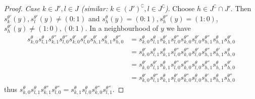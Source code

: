 \documentclass[ALCO,ThmDefs,Unicode,epreuves]{cedram}
\begin{document}
\begin{proof}
\emph{Case $k\in J',l\in J$ (similar: $k\in(J')^\complement, l\in J^\complement$)}.
Choose $h\in J^\complement\cap J'$.
Then $s^{\theta'}_k(y),s^{\theta'}_l(y)\neq (0:1)$ and
$s^\theta_h(y)=(0:1),s^{\theta''}_h(y)=(1:0)$, 
$s^{\theta'}_h(y)\neq (1:0),(0:1)$.
In a neighbourhood of $y$ we have
\[
\begin{aligned}
s^\theta_{k,0}s^\theta_{l,1}s^{\theta''}_{k,1}s^{\theta''}_{l,0}
s^{\theta'}_{k,0}s^{\theta'}_{l,0}
s^{\theta'}_{h,1}s^\theta_{h,1}s^{\theta''}_{h,0}
&=s^\theta_{k,0}s^\theta_{l,1}s^{\theta'}_{k,1}s^{\theta''}_{l,0}
s^{\theta''}_{k,0}s^{\theta'}_{l,0}
s^{\theta''}_{h,1}s^\theta_{h,1}s^{\theta'}_{h,0}\\
&=s^{\theta'}_{k,0}s^\theta_{l,1}s^\theta_{k,1}s^{\theta''}_{l,0}
s^{\theta''}_{k,0}s^{\theta'}_{l,0}
s^{\theta''}_{h,1}s^{\theta'}_{h,1}s^\theta_{h,0}\\
&=s^{\theta'}_{k,0}s^{\theta'}_{l,1}s^\theta_{k,1}s^{\theta''}_{l,0}
s^{\theta''}_{k,0}s^\theta_{l,0}
s^{\theta''}_{h,1}s^\theta_{h,1}s^{\theta'}_{h,0}\\
&=s^{\theta'}_{k,0}s^{\theta''}_{l,1}s^\theta_{k,1}s^{\theta'}_{l,0}
s^{\theta''}_{k,0}s^\theta_{l,0}
s^{\theta'}_{h,1}s^\theta_{h,1}s^{\theta''}_{h,0}
\end{aligned}
\]
thus 
$s^\theta_{k,0}s^\theta_{l,1}s^{\theta''}_{k,1}s^{\theta''}_{l,0}
=s^\theta_{k,1}s^\theta_{l,0}s^{\theta''}_{k,0}s^{\theta''}_{l,1}$.
\end{proof}
\end{document}
